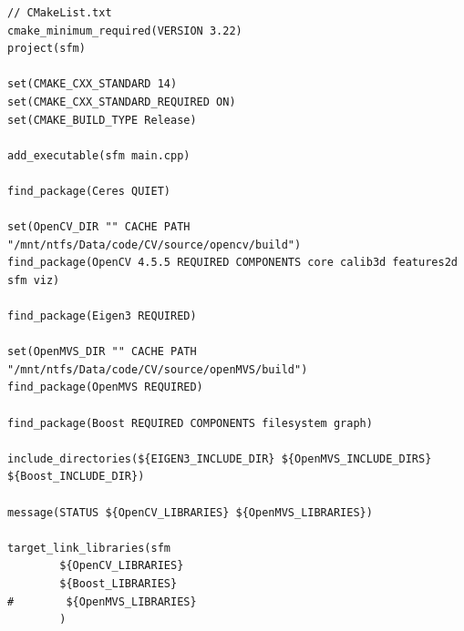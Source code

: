 \documentclass[a4paper, 12pt]{article}
\begin{document}
	\begin{lstlisting}
// CMakeList.txt		
cmake_minimum_required(VERSION 3.22)
project(sfm)

set(CMAKE_CXX_STANDARD 14)
set(CMAKE_CXX_STANDARD_REQUIRED ON)
set(CMAKE_BUILD_TYPE Release)

add_executable(sfm main.cpp)

find_package(Ceres QUIET)

set(OpenCV_DIR "" CACHE PATH "/mnt/ntfs/Data/code/CV/source/opencv/build")
find_package(OpenCV 4.5.5 REQUIRED COMPONENTS core calib3d features2d sfm viz)

find_package(Eigen3 REQUIRED)

set(OpenMVS_DIR "" CACHE PATH "/mnt/ntfs/Data/code/CV/source/openMVS/build")
find_package(OpenMVS REQUIRED)

find_package(Boost REQUIRED COMPONENTS filesystem graph)

include_directories(${EIGEN3_INCLUDE_DIR} ${OpenMVS_INCLUDE_DIRS} ${Boost_INCLUDE_DIR})

message(STATUS ${OpenCV_LIBRARIES} ${OpenMVS_LIBRARIES})

target_link_libraries(sfm
        ${OpenCV_LIBRARIES}
        ${Boost_LIBRARIES}
#        ${OpenMVS_LIBRARIES}
        )

	\end{lstlisting}
\end{document}
